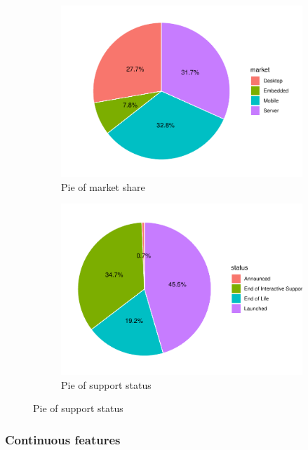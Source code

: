 \begin{figure}[h!]
    \centering
    \begin{subfigure}[b]{0.49\textwidth}
        \centering
        \includegraphics[width=\textwidth]{./graphics/pie_market.pdf}
        \caption{Pie of market share}
    \end{subfigure}
    \hfill
    \begin{subfigure}[b]{0.49\textwidth}
        \centering
        \includegraphics[width=\textwidth]{./graphics/pie_status.pdf}
        \caption{Pie of support status}
    \end{subfigure}
\end{figure}

\subsubsection{Continuous features}

